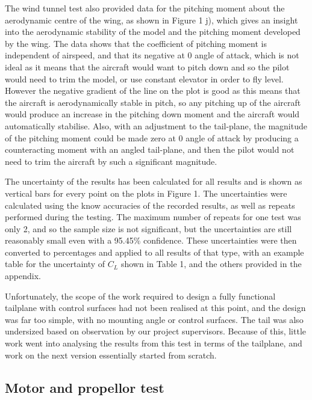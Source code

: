 \documentclass[../../main.tex]{subfiles}
\begin{document}
The wind tunnel test also provided data for the pitching moment about the aerodynamic centre of the wing, as shown in Figure 1 j), which gives an insight into the aerodynamic stability of the model and the pitching moment developed by the wing.
The data shows that the coefficient of pitching moment is independent of airspeed, and that its negative at 0 angle of attack, which is not ideal as it means that the aircraft would want to pitch down and so the pilot would need to trim the model, or use constant elevator in order to fly level.
However the negative gradient of the line on the plot is good as this means that the aircraft is aerodynamically stable in pitch, so any pitching up of the aircraft would produce an increase in the pitching down moment and the aircraft would automatically stabilise.
Also, with an adjustment to the tail-plane, the magnitude of the pitching moment could be made zero at 0 angle of attack by producing a counteracting moment with an angled tail-plane, and then the pilot would not need to trim the aircraft by such a significant magnitude. 

The uncertainty of the results has been calculated for all results and is shown as vertical bars for every point on the plots in Figure 1.
The uncertainties were calculated using the know accuracies of the recorded results, as well as repeats performed during the testing.
The maximum number of repeats for one test was only 2, and so the sample size is not significant, but the uncertainties are still reasonably small even with a 95.45\% confidence.
These uncertainties were then converted to percentages and applied to all results of that type, with an example table for the uncertainty of $C_L$ shown in Table 1, and the others provided in the appendix. 


Unfortunately, the scope of the work required to design a fully functional tailplane with control surfaces had not been realised at this point, and the design was far too simple, with no mounting angle or control surfaces.
The tail was also undersized based on observation by our project supervisors.
Because of this, little work went into analysing the results from this test in terms of the tailplane, and work on the next version essentially started from scratch. 

\subsection{Motor and propellor test} \label{sec:design-process:interim-design-review:motor-and-propellor-test}
\end{document}
